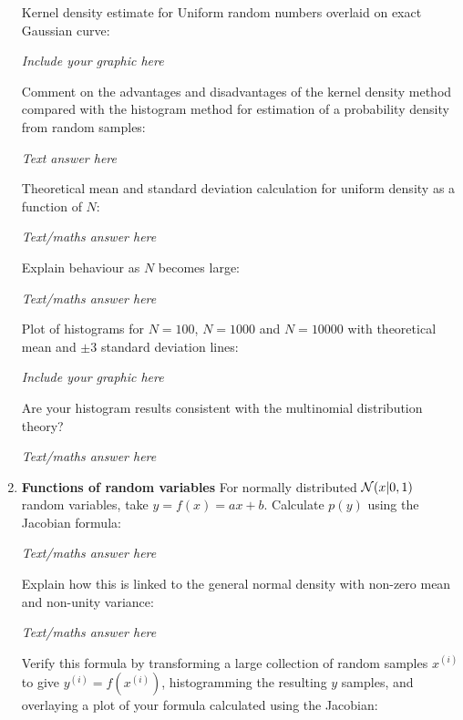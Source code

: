 \documentclass[12pt]{article}
\begin{document}
\begin{enumerate}
Kernel density estimate for Uniform random numbers overlaid on exact Gaussian curve:


{\em Include your graphic here}
\vspace{3in}

Comment on the advantages and disadvantages of the kernel density method compared with the histogram method for estimation of a probability density from random samples:


{\em Text answer  here}
\vspace{3in}



Theoretical  mean and standard deviation calculation for uniform density as a function of $N$:


{\em Text/maths answer  here}
\vspace{3in}


Explain behaviour as $N$ becomes large:

{\em Text/maths answer  here}
\vspace{3in}



Plot of histograms for $N=100$,  $N=1000$ and $N=10000$ with theoretical mean  and $\pm 3$ standard deviation lines:


{\em Include your graphic here}
\vspace{3in}




 Are your histogram results consistent with the multinomial distribution theory? 


{\em Text/maths answer  here}
\vspace{3in}


\item {\bf Functions of random variables}
For normally distributed ${\cal N}(x|0,1)$ random variables, take $y=f(x)=ax+b$. Calculate $p(y)$ using the Jacobian formula:


{\em Text/maths answer  here}
\vspace{3in}


Explain how this is linked to the general normal density with non-zero mean and non-unity variance:


{\em Text/maths answer  here}
\vspace{3in}



 Verify this formula by transforming a large collection of random samples $x^{(i)}$ to give $y^{(i)}=f(x^{(i)})$, histogramming the resulting $y$ samples, and overlaying a plot of your formula calculated using the Jacobian:



\end{enumerate}
\end{document}
